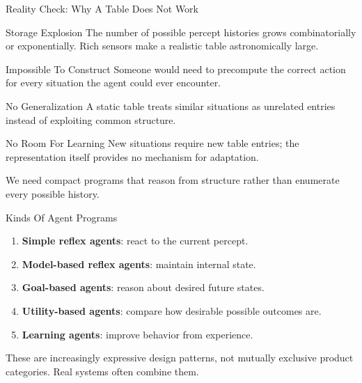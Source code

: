 \documentclass[aspectratio=169,10pt]{beamer}
\begin{document}
\begin{frame}[shrink=35]{Reality Check: Why A Table Does Not Work}
  \begin{block}{Storage Explosion}
    The number of possible percept histories grows combinatorially or exponentially. Rich sensors make a realistic table astronomically large.
  \end{block}
  \begin{block}{Impossible To Construct}
    Someone would need to precompute the correct action for every situation the agent could ever encounter.
  \end{block}
  \begin{block}{No Generalization}
    A static table treats similar situations as unrelated entries instead of exploiting common structure.
  \end{block}
  \begin{block}{No Room For Learning}
    New situations require new table entries; the representation itself provides no mechanism for adaptation.
  \end{block}
  \vspace{0.06in}
  \begin{keyidea}
    We need compact programs that reason from structure rather than enumerate every possible history.
  \end{keyidea}
\end{frame}

\begin{frame}{Kinds Of Agent Programs}
  \begin{enumerate}
    \item \textbf{Simple reflex agents}: react to the current percept.
    \item \textbf{Model-based reflex agents}: maintain internal state.
    \item \textbf{Goal-based agents}: reason about desired future states.
    \item \textbf{Utility-based agents}: compare how desirable possible outcomes are.
    \item \textbf{Learning agents}: improve behavior from experience.
  \end{enumerate}
  \vspace{0.14in}
  \begin{keyidea}
    These are increasingly expressive design patterns, not mutually exclusive product categories. Real systems often combine them.
  \end{keyidea}
\end{frame}
\end{document}
